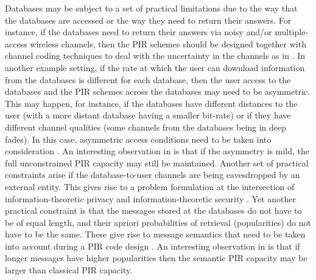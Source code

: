 Databases may be subject to a set of practical limitations due to the way that the databases are accessed or the way they need to return their answers. For instance, if the databases need to return their answers via noisy and/or multiple-access wireless channels, then the PIR schemes should be designed together with channel coding techniques to deal with the uncertainty in the channels as in \cite{NoisyPIR}. In another example setting, if the rate at which the user can download information from the databases is different for each database, then the user access to the databases and the PIR schemes across the databases may need to be asymmetric. This may happen, for instance, if the databases have different distances to the user (with a more distant database having a smaller bit-rate) or if they have different channel qualities (some channels from the databases being in deep fades). In this case, asymmetric access conditions need to be taken into consideration \cite{AsymmetryHurtsPIR}. An interesting observation in \cite{AsymmetryHurtsPIR} is that if the asymmetry is mild, the full unconstrained PIR capacity may still be maintained. Another set of practical constraints arise if the database-to-user channels are being eavesdropped by an external entity. This gives rise to a problem formulation at the intersection of information-theoretic privacy and information-theoretic security \cite{SecurePIR, securePIRcapacity, PIR_WTC_II, securestoragePIR}. Yet another practical constraint is that the messages stored at the databases do not have to be of equal length, and their apriori probabilities of retrieval (popularities) do not have to be the same. These give rise to message semantics that need to be taken into account during a PIR code design \cite{SemanticPIR}. An interesting observation in \cite{SemanticPIR} is that if longer messages have higher popularities then the semantic PIR capacity may be larger than classical PIR capacity.


